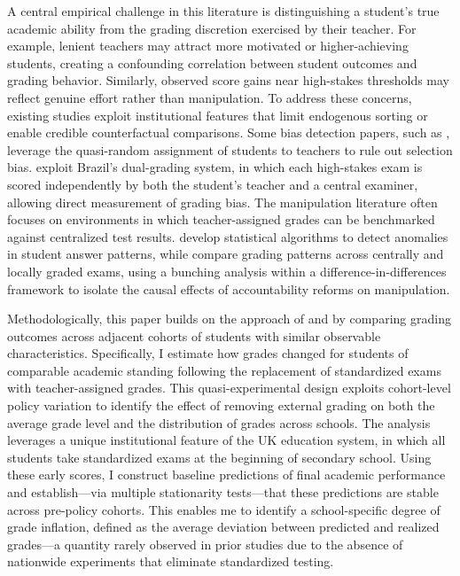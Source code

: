 A central empirical challenge in this literature is distinguishing a student’s true academic ability from the grading discretion exercised by their teacher. For example, lenient teachers may attract more motivated or higher-achieving students, creating a confounding correlation between student outcomes and grading behavior. Similarly, observed score gains near high-stakes thresholds may reflect genuine effort rather than manipulation. To address these concerns, existing studies exploit institutional features that limit endogenous sorting or enable credible counterfactual comparisons. Some bias detection papers, such as \citet{lavy2018}, leverage the quasi-random assignment of students to teachers to rule out selection bias. \citet{ferman2022} exploit Brazil’s dual-grading system, in which each high-stakes exam is scored independently by both the student’s teacher and a central examiner, allowing direct measurement of grading bias. The manipulation literature often focuses on environments in which teacher-assigned grades can be benchmarked against centralized test results. \citet{jacob2003} develop statistical algorithms to detect anomalies in student answer patterns, while \citet{dee2019} compare grading patterns across centrally and locally graded exams, using a bunching analysis within a difference-in-differences framework to isolate the causal effects of accountability reforms on manipulation.


Methodologically, this paper builds on the approach of \citet{neal2008} and \cite{denning2023} by comparing grading outcomes across adjacent cohorts of students with similar observable characteristics. Specifically, I estimate how grades changed for students of comparable academic standing following the replacement of standardized exams with teacher-assigned grades. This quasi-experimental design exploits cohort-level policy variation to identify the effect of removing external grading on both the average grade level and the distribution of grades across schools. The analysis leverages a unique institutional feature of the UK education system, in which all students take standardized exams at the beginning of secondary school. Using these early scores, I construct baseline predictions of final academic performance and establish—via multiple stationarity tests—that these predictions are stable across pre-policy cohorts. This enables me to identify a school-specific degree of grade inflation, defined as the average deviation between predicted and realized grades—a quantity rarely observed in prior studies due to the absence of nationwide experiments that eliminate standardized testing.


